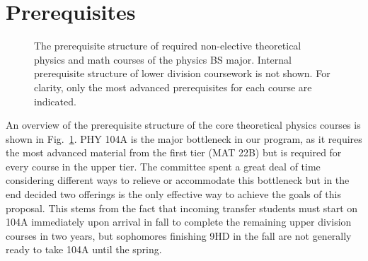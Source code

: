 \documentclass[12pt]{article}
\begin{document}
\section{Prerequisites}

\begin{figure}
\begin{center}

\caption{\label{fig:prereqs} The prerequisite structure of required
  non-elective theoretical physics and math courses of the physics BS
  major.  Internal prerequisite structure of lower division coursework
  is not shown.  For clarity, only the most advanced prerequisites for
  each course are indicated.}
\end{center}
\end{figure}

An overview of the prerequisite structure of the core theoretical
physics courses is shown in Fig.~\ref{fig:prereqs}.  PHY 104A is the
major bottleneck in our program, as it requires the most advanced
material from the first tier (MAT 22B) but is required for every
course in the upper tier.  The committee spent a great deal of time
considering different ways to relieve or accommodate this bottleneck
but in the end decided two offerings is the only effective way to
achieve the goals of this proposal.  This stems from the fact that
incoming transfer students must start on 104A immediately upon arrival
in fall to complete the remaining upper division courses in two years,
but sophomores finishing 9HD in the fall are not generally ready to
take 104A until the spring.
\end{document}
